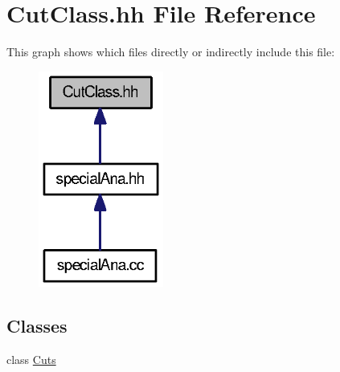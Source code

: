 \section{Cut\-Class.\-hh File Reference}
\label{CutClass_8hh}
This graph shows which files directly or indirectly include this file\-:\nopagebreak
\begin{figure}[H]
\begin{center}
\leavevmode
\includegraphics[width=116pt]{CutClass_8hh__dep__incl}
\end{center}
\end{figure}
\subsection*{Classes}
\begin{DoxyCompactItemize}
\item 
class \hyperlink{classCuts}{Cuts}
\end{DoxyCompactItemize}
